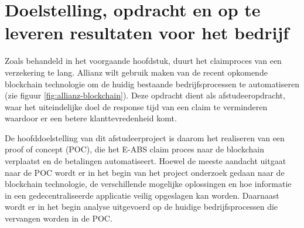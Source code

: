 \chapter{Doelstelling, opdracht en op te leveren resultaten voor het bedrijf}
Zoals behandeld in het voorgaande hoofdstuk, duurt het claimproces van een verzekering te lang. Allianz wilt gebruik maken van de recent opkomende blockchain technologie om de huidig bestaande bedrijfsprocessen te automatiseren (zie figuur \ref{fig:allianz-blockchain}). Deze opdracht dient als afstudeeropdracht, waar het uiteindelijke doel de response tijd van een claim te verminderen waardoor er een betere klanttevredenheid komt.\par

De hoofddoelstelling van dit afstudeerproject is daarom het realiseren van een proof of concept (POC), die het E-ABS claim proces naar de blockchain verplaatst en de betalingen automatiseert. Hoewel de meeste aandacht uitgaat naar de POC wordt er in het begin van het project onderzoek gedaan naar de blockchain technologie, de verschillende mogelijke oplossingen en hoe informatie in een gedecentraliseerde applicatie veilig opgeslagen kan worden. Daarnaast wordt er in het begin analyse uitgevoerd op de huidige bedrijfsprocessen die vervangen worden in de POC.

